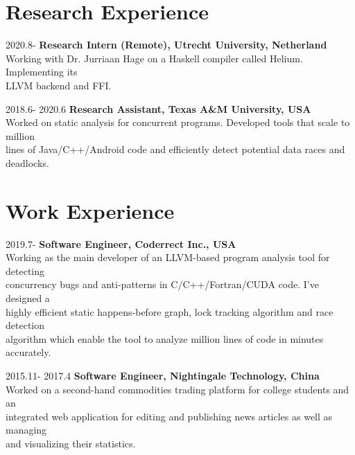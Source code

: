 \documentclass[12pt,letterpaper]{report}
\begin{document}

	\section*{Research Experience}

	\begin{tablist}[style=multiline, leftmargin=*]
		\item[2020.8-]
		\tab \textbf{Research Intern (Remote), Utrecht University, Netherland}\\
		\tab Working with Dr. Jurriaan Hage on a Haskell compiler called Helium. Implementing its\\
		\tab LLVM backend and FFI.
		\item[2018.6- 2020.6]
		\tab \textbf{Research Assistant, Texas A\&M University, USA}\\
		\tab Worked on static analysis for concurrent programs. Developed tools that scale to million\\
		\tab lines of Java/C++/Android code and efficiently detect potential data races and deadlocks.
	\end{tablist}

\pagebreak

 	\section*{Work Experience}
	
	\begin{tablist}[style=multiline, leftmargin=*]
		\item[2019.7-]
		\tab \textbf{Software Engineer, Coderrect Inc., USA}\\
		\tab Working as the main developer of an LLVM-based program analysis tool for detecting\\
		\tab concurrency bugs and anti-patterns in C/C++/Fortran/CUDA code. I've designed a\\
		\tab highly efficient static happens-before graph, lock tracking algorithm and race detection\\
		\tab algorithm which enable the tool to analyze million lines of code in minutes accurately.
		\item[2015.11- 2017.4]
		\tab \textbf{Software Engineer, Nightingale Technology, China}\\
		\tab Worked on a second-hand commodities trading platform for college students and an\\
		\tab integrated web application for editing and publishing news articles as well as managing\\
		\tab and visualizing their statistics.
	\end{tablist}
\end{document}
